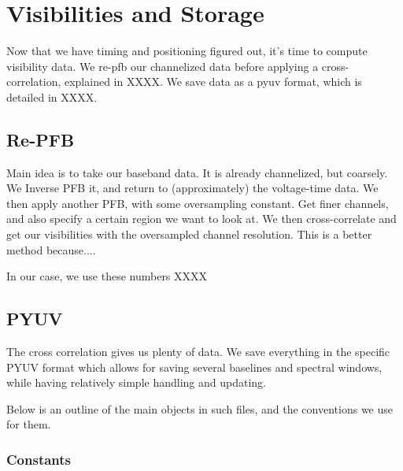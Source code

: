 \chapter{Visibilities and Storage}
\label{chap:visibilities_and_storage}

Now that we have timing and positioning figured out, it's time to compute visibility data.
We re-pfb our channelized data before applying a cross-correlation, explained in XXXX.
We save data as a pyuv format, which is detailed in XXXX.

\section{Re-PFB}

Main idea is to take our baseband data. It is already channelized, but coarsely. 
We Inverse PFB it, and return to (approximately) the voltage-time data.
We then apply another PFB, with some oversampling constant.
Get finer channels, and also specify a certain region we want to look at.
We then cross-correlate and get our visibilities with the oversampled channel resolution.
This is a better method because....

In our case, we use these numbers XXXX


\section{PYUV}

The cross correlation gives us plenty of data.
We save everything in the specific PYUV format which allows for saving several baselines and spectral windows,
while having relatively simple handling and updating.

Below is an outline of the main objects in such files, and the conventions we use for them.


\subsection{Constants}


